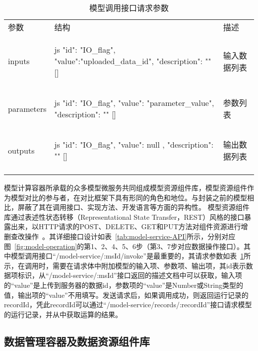 \begin{table}[!htbp]
    \centering
    \caption{模型调用接口请求参数}
    \label{tab:model-invoke-API}
    \begin{tabular}{lp{}l}
        \Xhline{1.5pt}
        参数 & 结构 & 描述 \\
        \Xhline{1.5pt}
        inputs 
        & 
\begin{tabminted}[tabsize=4]{js}
{
  "id": "IO_flag", 
  "value":"uploaded_data_id",
  "description": ""
}[]
\end{tabminted}
        & 输入数据列表 \\
        \hline
        parameters 
        &
\begin{tabminted}[tabsize=4]{js}
{
  "id": "IO_flag", 
  "value": "parameter_value",
  "description": ""
}[]
\end{tabminted}
        & 参数列表 \\
        \hline
        outputs 
        &
\begin{tabminted}[tabsize=4]{js}
{ 
  "id": "IO_flag", 
  "value": null ,
  "description": ""
}[]
\end{tabminted}
        & 输出数据列表 \\
        \Xhline{1.5pt}
    \end{tabular}
\end{table}
模型计算容器所承载的众多模型微服务共同组成模型资源组件库，模型资源组件作为模型对比的参与者，在对比框架下具有形同的角色和地位。与封装之前的模型相比，屏蔽了其在调用接口、实现方法、开发语言等方面的异构性。
模型资源组件库通过表述性状态转移（Representational State Transfer，REST）风格的接口暴露出来，以HTTP请求的POST、DELETE、GET和PUT方法对组件资源进行增删查改操作~\cite{fielding2000architectural}。其详细接口设计如表~\ref{tab:model-service-API}所示，分别对应图~\ref{fig:model-operation}的第1、2、4、5、6步（第3、7步对应数据操作接口）。其中模型调用接口“/model-service/:msId/invoke”是最重要的，其请求参数如表~\ref{tab:model-invoke-API}所示，在调用时，需要在请求体中附加模型的输入项、参数项、输出项，其id表示数据项标识，从“/model-service/:msId”接口返回的描述文档中可以获取，输入项的“value”是上传到服务器的数据id，参数项的“value”是Number或String类型的值，输出项的“value”不用填写。发送请求后，如果调用成功，则返回运行记录的recordId，凭此recordId可以通过“/model-service/records/:recordId”接口请求模型的运行记录，并从中获取运算的结果。

\subsection{数据管理容器及数据资源组件库}
